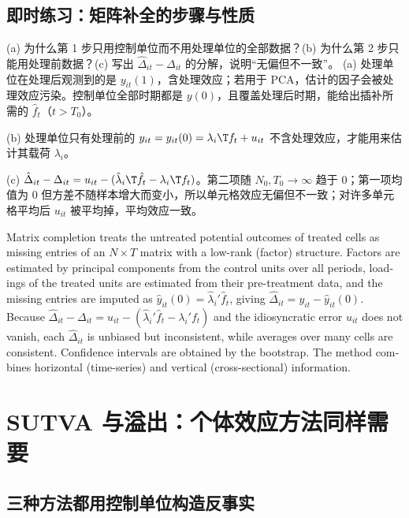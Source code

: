 \subsection{即时练习：矩阵补全的步骤与性质}

\begin{prac}[矩阵补全的步骤与性质]
(a) 为什么第 1 步只用控制单位而不用处理单位的全部数据？(b) 为什么第 2 步只能用处理前数据？(c) 写出 $\hat\Delta_{it}-\Delta_{it}$ 的分解，说明“无偏但不一致”。
\answer
(a) 处理单位在处理后观测到的是 $y_{it}(1)$，含处理效应；若用于 PCA，估计的因子会被处理效应污染。控制单位全部时期都是 $y(0)$，且覆盖处理后时期，能给出插补所需的 $\hat f_t$（$t>T_0$）。

(b) 处理单位只有处理前的 $y_{it}=y_{it}(0)=\lambda_i\T f_t+u_{it}$ 不含处理效应，才能用来估计其载荷 $\lambda_i$。

(c) $\hat\Delta_{it}-\Delta_{it}=u_{it}-(\hat\lambda_i\T\hat f_t-\lambda_i\T f_t)$。第二项随 $N_0,T_0\to\infty$ 趋于 0；第一项均值为 0 但方差不随样本增大而变小，所以单元格效应无偏但不一致；对许多单元格平均后 $u_{it}$ 被平均掉，平均效应一致。
\end{prac}

\begin{english}
Matrix completion treats the untreated potential outcomes of treated cells as missing entries of an $N\times T$ matrix with a low-rank (factor) structure. Factors are estimated by principal components from the control units over all periods, loadings of the treated units are estimated from their pre-treatment data, and the missing entries are imputed as $\hat y_{it}(0)=\hat\lambda_i'\hat f_t$, giving $\hat\Delta_{it}=y_{it}-\hat y_{it}(0)$. Because $\hat\Delta_{it}-\Delta_{it}=u_{it}-(\hat\lambda_i'\hat f_t-\lambda_i'f_t)$ and the idiosyncratic error $u_{it}$ does not vanish, each $\hat\Delta_{it}$ is unbiased but inconsistent, while averages over many cells are consistent. Confidence intervals are obtained by the bootstrap. The method combines horizontal (time-series) and vertical (cross-sectional) information.
\end{english}

\section{SUTVA 与溢出：个体效应方法同样需要}\label{sec:U16-sutva}

\subsection{三种方法都用控制单位构造反事实}

